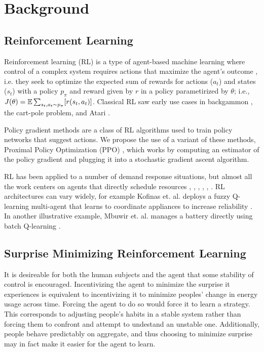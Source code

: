 \section{Background} \label{sec:background}

\subsection{Reinforcement Learning}
Reinforcement learning (RL) is a type of agent-based machine learning 
where control of a complex system requires actions that maximize the agent's outcome \citep{sutton2018reinforcement}, 
i.e. they seek to optimize the expected sum of rewards for actions ($a_t$) and states ($s_t$) with a policy $p_\pi$ and reward given by $ r $ 
in a policy parametirized by 
$\theta$; i.e.,  $J(\theta) = \operatorname{\mathbb{E}}\sum_{s_t,a_t \sim p_{\pi}}[r(s_t, a_t)]$. 
Classical RL saw early use cases in backgammon \citep{tesauro1994td}, 
the cart-pole problem, and Atari \citep{mnih2013playing}. 

Policy gradient methods are a class of RL algorithms used to train policy networks that suggest actions.
We propose the use of a variant of these methods, Proximal Policy Optimization (PPO) \citep{schulmanPPO}, which works by computing an estimator of the policy gradient 
and plugging it into a stochastic gradient ascent algorithm. 

RL has been applied to a number of demand response situations, but almost all the work centers on agents that directly schedule resources \citep{6963416}, \citep{7018632}, \citep{6848212}, \citep{6915886}, \citep{RAJU2015231}, \citep{FUSELLI2013148}. RL architectures can vary widely, for example Kofinas et. al. deploys a fuzzy Q-learning multi-agent that learns to coordinate appliances to increase reliability \citep{KOFINAS201853}. In another illustrative example, Mbuwir et. al. manages a battery directly using batch Q-learning \citep{en10111846}. 


\subsection{Surprise Minimizing Reinforcement Learning}

It is desireable for both the human subjects and the agent that some stability of control is encouraged. 
Incentivizing the agent to minimize the surprise it experiences is equivalent to incentivizing it to minimize peoples' change in energy usage across time. Forcing the agent to do so would force it to learn a strategy. This corresponds to adjusting people's habits in a stable system rather than forcing them to confront and attempt to undestand an unstable one.
Additionally, people behave predictably on aggregate, and thus choosing to minimize surprise may in fact make it easier for the agent to learn.


